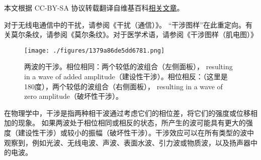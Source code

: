 
本文根据 CC-BY-SA 协议转载翻译自维基百科\href{https://en.wikipedia.org/wiki/Wave_interference}{相关文章}。

对于无线电通信中的干扰，请参阅《干扰（通信）》。
“干涉图样”在此重定向。有关莫尔条纹，请参阅《莫尔条纹》。对于医学术语，请参阅《干涉图样（肌电图）》
\begin{figure}[ht]
\centering
\texttt{[image: ./figures/1379a86de5dd6781.png]}
\caption{两波的干涉。相位相同：两个较低的波组合（左侧面板）， resulting in a wave of added amplitude（建设性干涉）。相位相反：（这里是180度），两个较低的波组合（右侧面板）， resulting in a wave of zero amplitude（破坏性干涉）。} \label{fig_GSWLX_1}
\end{figure}
在物理学中，干涉是指两种相干波通过考虑它们的相位差，将它们的强度或位移相加的现象。 如果两波处于相位相同或相反的状态，所产生的波可能具有更大的强度（建设性干涉）或较小的振幅（破坏性干涉）。干涉效应可以在所有类型的波中观察到，例如光波、无线电波、声波、表面水波、引力波或物质波，以及扬声器中的电波。
